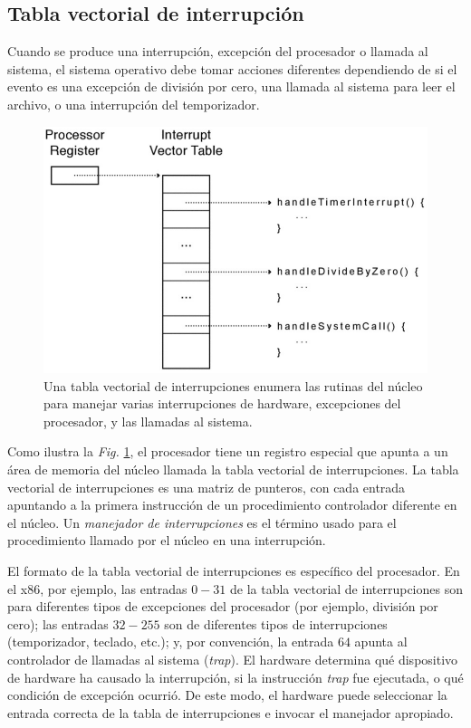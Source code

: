 \documentclass[10pt]{book}
\begin{document}
\subsection{Tabla vectorial de interrupción}
Cuando se produce una interrupción, excepción del procesador o llamada al sistema, el sistema operativo debe tomar acciones diferentes dependiendo de si el evento es una excepción de división por cero, una llamada al sistema para leer el archivo, o una interrupción del temporizador.
\begin{figure}[tbhp]
\centerline{\includegraphics[scale=0.55]{img/fig0204}}
\caption{Una tabla vectorial de interrupciones enumera las rutinas del núcleo para manejar varias interrupciones de hardware, excepciones del procesador, y las llamadas al sistema.}
\label{fig0204}
\end{figure}

Como ilustra la \textit{Fig.} \ref{fig0204}, el procesador tiene un registro especial que apunta a un área de memoria del núcleo llamada la tabla vectorial de interrupciones. La tabla vectorial de interrupciones es una matriz de punteros, con cada entrada apuntando a la primera instrucción de un procedimiento controlador diferente en el núcleo. Un \textit{manejador de interrupciones} es el término usado para el procedimiento llamado por el núcleo en una interrupción.

El formato de la tabla vectorial de interrupciones es específico del procesador. En el x86, por ejemplo, las entradas $0-31$ de la tabla vectorial de interrupciones son para diferentes tipos de excepciones del procesador (por ejemplo, división por cero); las entradas $32-255$ son de diferentes tipos de interrupciones (temporizador, teclado, etc.); y, por convención, la entrada $64$ apunta al controlador de llamadas al sistema (\textit{trap}). El hardware determina qué dispositivo de hardware ha causado la interrupción, si la instrucción \textit{trap} fue ejecutada, o qué condición de excepción ocurrió. De este modo, el hardware puede seleccionar la entrada correcta de la tabla de interrupciones e invocar el manejador apropiado.
\end{document}
